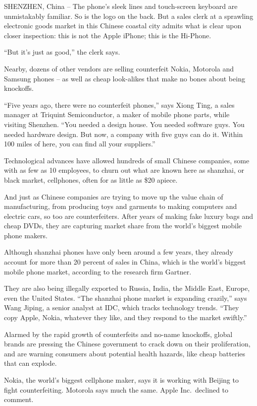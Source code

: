\documentclass[12pt,a4paper,onecolumn]{article}
\begin{document}
SHENZHEN, China -- The phone's sleek lines and touch-screen keyboard are unmistakably familiar. So
is the logo on the back. But a sales clerk at a sprawling electronic goods market in this Chinese
coastal city admits what is clear upon closer inspection: this is not the Apple iPhone; this is the
Hi-Phone.

``But it's just as good,'' the clerk says.

Nearby, dozens of other vendors are selling counterfeit Nokia, Motorola and Samsung phones -- as
well as cheap look-alikes that make no bones about being knockoffs.

``Five years ago, there were no counterfeit phones,'' says Xiong Ting, a sales manager at Triquint
Semiconductor, a maker of mobile phone parts, while visiting Shenzhen. ``You needed a design house.
You needed software guys. You needed hardware design. But now, a company with five guys can do it.
Within 100 miles of here, you can find all your suppliers.''

Technological advances have allowed hundreds of small Chinese companies, some with as few as 10
employees, to churn out what are known here as shanzhai, or black market, cellphones, often for as
little as \$20 apiece.

And just as Chinese companies are trying to move up the value chain of manufacturing, from producing
toys and garments to making computers and electric cars, so too are counterfeiters. After years of
making fake luxury bags and cheap DVDs, they are capturing market share from the world's biggest
mobile phone makers.

Although shanzhai phones have only been around a few years, they already account for more than 20
percent of sales in China, which is the world's biggest mobile phone market, according to the
research firm Gartner.

They are also being illegally exported to Russia, India, the Middle East, Europe, even the United
States. ``The shanzhai phone market is expanding crazily,'' says Wang Jiping, a senior analyst at
IDC, which tracks technology trends. ``They copy Apple, Nokia, whatever they like, and they respond
to the market swiftly.''

Alarmed by the rapid growth of counterfeits and no-name knockoffs, global brands are pressing the
Chinese government to crack down on their proliferation, and are warning consumers about potential
health hazards, like cheap batteries that can explode.

Nokia, the world's biggest cellphone maker, says it is working with Beijing to fight counterfeiting.
Motorola says much the same. Apple Inc.~declined to comment.
\end{document}
